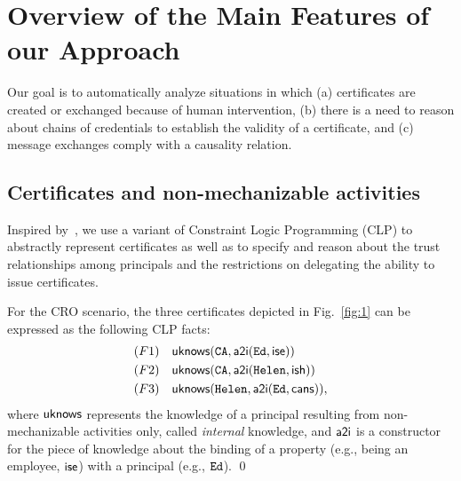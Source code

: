 \documentclass[conference]{llncs}
\newcommand{\theCA}{\ensuremath \mathtt{CA}}
\newcommand{\Ed}{\ensuremath \mathtt{Ed}}
\newcommand{\Helen}{\ensuremath \mathtt{Helen}}
\newcommand{\canstoredoc}{\ensuremath \mathsf{cans}}
\newcommand{\ishead}{\ensuremath \mathsf{ish}}
\newcommand{\isemployee}{\ensuremath \mathsf{ise}}
\newcommand{\atoi}{\ensuremath \mathsf{a2i}}
\newcommand{\knowzero}{\ensuremath \mathsf{uknows}}
\newcommand{\CRO}{CRO}
\begin{document}
\section{Overview of the Main Features of our Approach}
\label{sec:ex-overview}
Our goal is to automatically analyze situations in which (a)
certificates are created or exchanged because of human intervention, (b)
there is a need to reason about chains of credentials to establish the
validity of a certificate, and (c) message exchanges comply with a
causality relation.
\subsection{Certificates and non-mechanizable activities} 
Inspired by~\cite{constraintdatalog,GurevichNeeman-dkal}, we use a variant of
Constraint Logic Programming (CLP) to abstractly represent certificates
as well as to specify and reason about the trust relationships among
principals and the restrictions on delegating the ability to issue
certificates. 
\begin{example}
\label{ex:certsf}
For the \CRO{} scenario, the three certificates depicted
in Fig.~\ref{fig:1} can be expressed as the following CLP facts: 
\begin{align*}
(F1)\quad & \knowzero(\theCA, \atoi(\Ed,\isemployee)) \\
(F2)\quad & \knowzero(\theCA, \atoi(\Helen,\ishead))\\
(F3)\quad & \knowzero(\Helen, \atoi(\Ed,\canstoredoc)), 
\end{align*}
where $\knowzero$ represents the knowledge of
a principal resulting from non-mechanizable activities only,
called \emph{internal} knowledge, and $\atoi$ is a constructor for the
piece of knowledge about the binding of a property (e.g., being an
employee, $\isemployee$) with a principal (e.g., $\Ed$).
\qed
\end{example}
\end{document}
